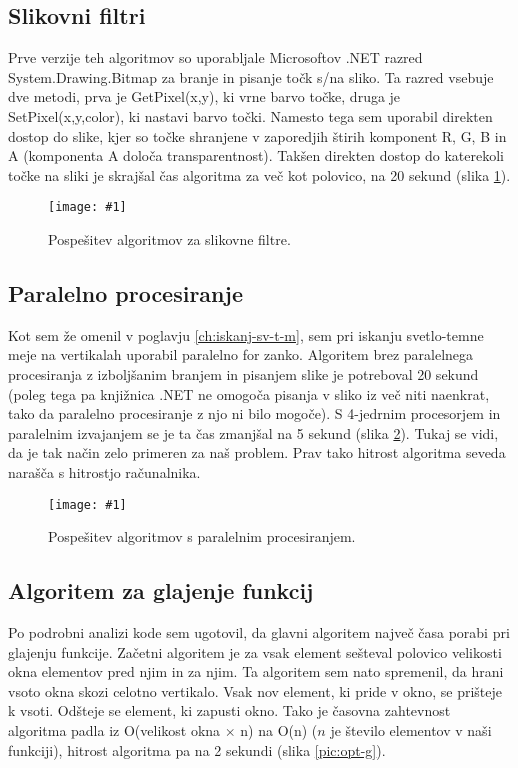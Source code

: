 \documentclass[oneside, a4paper, 12pt]{book}
\newcommand{\slika}[3]{
	\begin{figure}
	\begin{center}
	\texttt{[image: \#1]}
	\end{center}
	\vspace{-20pt}
	\caption{#2}
	\label{#3}
	\end{figure}
}
\begin{document}
\subsection{Slikovni filtri}
Prve verzije teh algoritmov so uporabljale Microsoftov .NET razred System.\-Drawing.\-Bitmap za branje in pisanje točk s/na sliko. Ta razred vsebuje dve metodi, prva je GetPixel(x,y), ki vrne barvo točke, druga je SetPixel(x,y,color), ki nastavi barvo točki. Namesto tega sem uporabil direkten dostop do slike, kjer so točke shranjene v zaporedjih štirih komponent R, G, B in A (komponenta A določa transparentnost). Takšen direkten dostop do katerekoli točke na sliki je skrajšal čas algoritma za več kot polovico, na 20 sekund (slika \ref{pic:opt-sf}).



\slika{slike/optimizacija_grafi/optimizacija-slikovnih-filtrov.jpg}{Pospešitev algoritmov za slikovne filtre.}{pic:opt-sf}


\subsection{Paralelno procesiranje}
Kot sem že omenil v poglavju \ref{ch:iskanj-sv-t-m}, sem pri iskanju svetlo-temne meje na vertikalah uporabil paralelno for zanko. Algoritem brez paralelnega procesiranja z izboljšanim branjem in pisanjem slike je potreboval 20 sekund (poleg tega pa knjižnica .NET ne omogoča pisanja v sliko iz več niti naenkrat, tako da paralelno procesiranje z njo ni bilo mogoče). S 4-jedrnim procesorjem in paralelnim izvajanjem se je ta čas zmanjšal na 5 sekund (slika \ref{pic:opt-p}). Tukaj se vidi, da je tak način zelo primeren za naš problem. Prav tako hitrost algoritma seveda narašča s hitrostjo računalnika.


\slika{slike/optimizacija_grafi/optimizacija-s-paralelnim-procesiranjem.jpg}{Pospešitev algoritmov s paralelnim procesiranjem.}{pic:opt-p}

\subsection{Algoritem za glajenje funkcij}
Po podrobni analizi kode sem ugotovil, da glavni algoritem največ časa porabi pri glajenju funkcije. Začetni algoritem je za vsak element sešteval polovico velikosti okna elementov pred njim in za njim. Ta algoritem sem nato spremenil, da hrani vsoto okna skozi celotno vertikalo. Vsak nov element, ki pride v okno, se prišteje k vsoti. Odšteje se element, ki zapusti okno. Tako je časovna zahtevnost algoritma padla iz O(velikost okna $\times$ n) na O(n) ($n$ je število elementov v naši funkciji), hitrost algoritma pa na 2 sekundi (slika \ref{pic:opt-g}).
\end{document}
